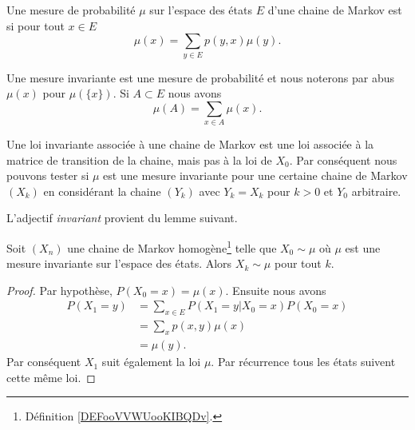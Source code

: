 \begin{definition}
	Une mesure de probabilité \( \mu\) sur l'espace des états \( E\) d'une chaine de Markov est  si pour tout \( x\in E\)
	\begin{equation}
		\mu(x)=\sum_{y\in E}p(y,x)\mu(y).
	\end{equation}
\end{definition}
\begin{remark}
	Une mesure invariante est une mesure de probabilité et nous noterons par abus \(  \mu(x)\) pour \( \mu(\{x\})\). Si \( A\subset E\) nous avons
	\begin{equation}
		\mu(A)=\sum_{x\in A}\mu(x).
	\end{equation}
\end{remark}

\begin{remark}  \label{RemwcRRFZ}
	Une loi invariante associée à une chaine de Markov est une loi associée à la matrice de transition de la chaine, mais pas à la loi de \( X_0\). Par conséquent nous pouvons tester si \( \mu\) est une mesure invariante pour une certaine chaine de Markov \( (X_k)\) en considérant la chaine \( (Y_k)\) avec \( Y_k=X_k\) pour \( k>0\) et \( Y_0\) arbitraire.
\end{remark}

L'adjectif \emph{invariant} provient du lemme suivant.
\begin{lemma}       \label{LemUVMwbM}
	Soit \( (X_n)\) une chaine de Markov homogène\footnote{Définition \ref{DEFooVVWUooKIBQDv}.} telle que \( X_0\sim\mu\) où \( \mu\) est une mesure invariante sur l'espace des états. Alors \( X_k\sim \mu\) pour tout \( k\).
\end{lemma}

\begin{proof}
	Par hypothèse, \( P(X_0=x)=\mu(x)\). Ensuite nous avons
	\begin{subequations}
		\begin{align}
			P(X_1=y) & =\sum_{x\in E}P(X_1=y|X_0=x)P(X_0=x) \\
			         & =\sum_xp(x,y)\mu(x)                  \\
			         & =\mu(y).
		\end{align}
	\end{subequations}
	Par conséquent \( X_1\) suit également la loi \( \mu\). Par récurrence tous les états suivent cette même loi.
\end{proof}

